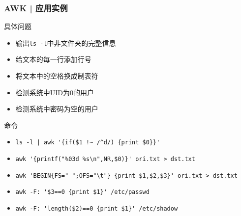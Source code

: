 \begin{frame}[fragile]
  \frametitle{AWK | \alert{应用实例}}
  \begin{block}{具体问题}
    \begin{itemize}
      \item<2-> 输出\verb|ls -l|中非文件夹的完整信息
      \item<4-> 给文本的每一行添加行号 
      \item<6-> 将文本中的空格换成制表符
      \item<8-> 检测系统中UID为0的用户
      \item<10-> 检测系统中密码为空的用户
    \end{itemize}
  \end{block}
  \begin{block}{命令}
    \begin{itemize}
      \item<3-> \verb=ls -l | awk '{if($1 !~ /^d/) {print $0}}'=
      \item<5-> {\small \verb|awk '{printf("%03d %s\n",NR,$0)}' ori.txt > dst.txt|}
      \item<7-> \verb|awk 'BEGIN{FS=" ";OFS="\t"} {print $1,$2,$3}' ori.txt > dst.txt|
      \item<9-> \verb|awk -F: '$3==0 {print $1}' /etc/passwd|
      \item<11-> \verb|awk -F: 'length($2)==0 {print $1}' /etc/shadow|
    \end{itemize}
  \end{block}
\end{frame}

